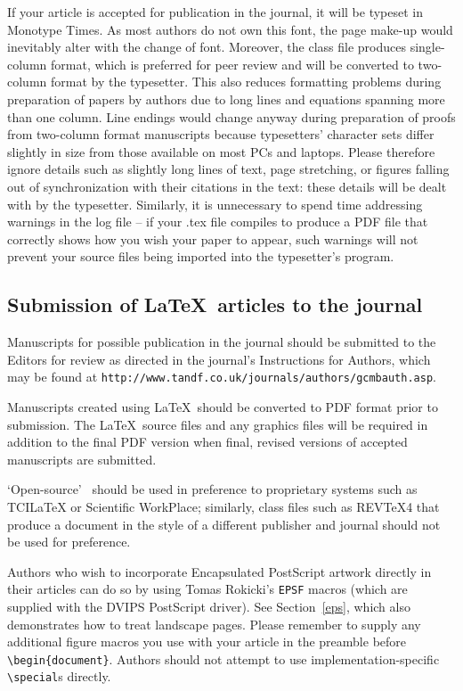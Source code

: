 \documentclass{gCMB2e}
\begin{document}
If your article is accepted for publication in the journal, it will be typeset in Monotype Times. As most authors do not own this font, the page make-up would inevitably alter with the change of font. Moreover, the class file produces single-column format, which is preferred for peer review and will be converted to two-column format by the typesetter. This also reduces formatting problems during preparation of papers by authors due to long lines and equations spanning more than one column. Line endings would change anyway during preparation of proofs from two-column format manuscripts because typesetters' character sets differ slightly in size from those available on most PCs and laptops. Please therefore ignore details such as slightly long lines of text, page stretching, or figures falling out of synchronization with their citations in the text: these details will be dealt with by the typesetter. Similarly, it is unnecessary to spend time addressing warnings in the log file -- if your .tex file compiles to produce a PDF file that correctly shows how you wish your paper to appear, such warnings will not prevent your source files being imported into the typesetter's program.


\subsection{Submission of \LaTeX\ articles to the journal}\label{S1.2}

Manuscripts for possible publication in the journal should be submitted to the Editors for review as directed in the journal's Instructions for Authors, which may be found at {\tt{http://www.tandf.co.uk/journals/authors/gcmbauth.asp}}.

Manuscripts created using \LaTeX\ should be converted to PDF format prior to submission. The \LaTeX\ source files and any graphics files will be required in addition to the final PDF version when final, revised versions of accepted manuscripts are submitted.

`Open-source' \LaTeXe\ should be used in preference to proprietary systems such as TCILaTeX or Scientific WorkPlace; similarly, class files such as REVTeX4 that produce a document in the style of a different publisher and journal should not be used for preference.

Authors who wish to incorporate Encapsulated PostScript artwork directly in their articles can do so by using
Tomas Rokicki's {\tt EPSF} macros (which are supplied with the DVIPS PostScript driver). See Section~\ref{eps},
which also demonstrates how to treat landscape pages. Please remember to supply any additional figure macros you
use with your article in the preamble before \verb"\begin{document}". Authors should not attempt to use
implementation-specific \verb"\special"s directly.
\end{document}
